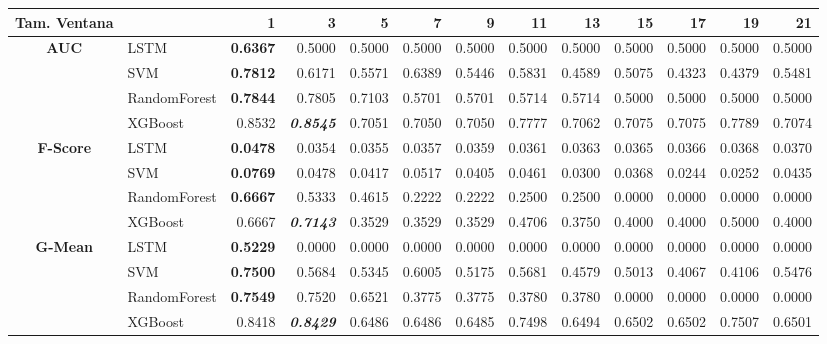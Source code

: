 \begin{table}[H]
	\centering
	\begin{adjustbox}{max width=12cm}
		\begin{tabular}{|c|l|r|r|r|r|r|r|r|r|r|r|r|}
			\hline
			\textbf{Tam. Ventana}&         &      1  &      3  &      5  &      7  &      9  &      11 &      13 &      15 &      17 &      19 &      21 \\
			\hline
			\textbf{AUC} &  LSTM & \textbf{  0.6367 } &  0.5000 &  0.5000 &  0.5000 &  0.5000 &  0.5000 &  0.5000 &  0.5000 &  0.5000 &  0.5000 &  0.5000 \\
			&  SVM & \textbf{  0.7812 } &  0.6171 &  0.5571 &  0.6389 &  0.5446 &  0.5831 &  0.4589 &  0.5075 &  0.4323 &  0.4379 &  0.5481 \\
			&  RandomForest & \textbf{  0.7844 } &  0.7805 &  0.7103 &  0.5701 &  0.5701 &  0.5714 &  0.5714 &  0.5000 &  0.5000 &  0.5000 &  0.5000 \\
			&  XGBoost &  0.8532 & \textit{ \textbf{  0.8545 } } &  0.7051 &  0.7050 &  0.7050 &  0.7777 &  0.7062 &  0.7075 &  0.7075 &  0.7789 &  0.7074 \\
			\hline
			\textbf{F-Score} &  LSTM & \textbf{  0.0478 } &  0.0354 &  0.0355 &  0.0357 &  0.0359 &  0.0361 &  0.0363 &  0.0365 &  0.0366 &  0.0368 &  0.0370 \\
			&  SVM & \textbf{  0.0769 } &  0.0478 &  0.0417 &  0.0517 &  0.0405 &  0.0461 &  0.0300 &  0.0368 &  0.0244 &  0.0252 &  0.0435 \\
			&  RandomForest & \textbf{  0.6667 } &  0.5333 &  0.4615 &  0.2222 &  0.2222 &  0.2500 &  0.2500 &  0.0000 &  0.0000 &  0.0000 &  0.0000 \\
			&  XGBoost &  0.6667 & \textit{ \textbf{  0.7143 } } &  0.3529 &  0.3529 &  0.3529 &  0.4706 &  0.3750 &  0.4000 &  0.4000 &  0.5000 &  0.4000 \\
			\hline
			\textbf{G-Mean} &  LSTM & \textbf{  0.5229 } &  0.0000 &  0.0000 &  0.0000 &  0.0000 &  0.0000 &  0.0000 &  0.0000 &  0.0000 &  0.0000 &  0.0000 \\
			&  SVM & \textbf{  0.7500 } &  0.5684 &  0.5345 &  0.6005 &  0.5175 &  0.5681 &  0.4579 &  0.5013 &  0.4067 &  0.4106 &  0.5476 \\
			&  RandomForest & \textbf{  0.7549 } &  0.7520 &  0.6521 &  0.3775 &  0.3775 &  0.3780 &  0.3780 &  0.0000 &  0.0000 &  0.0000 &  0.0000 \\
			&  XGBoost &  0.8418 & \textit{ \textbf{  0.8429 } } &  0.6486 &  0.6486 &  0.6485 &  0.7498 &  0.6494 &  0.6502 &  0.6502 &  0.7507 &  0.6501 \\

\end{tabular}
\end{adjustbox}
\end{table}
